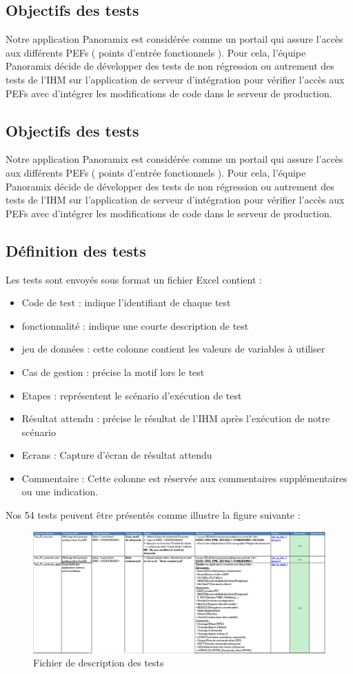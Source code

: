 \subsection{Objectifs des tests}
Notre application Panoramix est considérée comme un portail qui assure l’accès aux différents PEFs ( points d’entrée fonctionnels ). Pour cela, l’équipe Panoramix décide de développer des  tests de non régression ou autrement des tests de l’IHM sur l’application de serveur d'intégration pour vérifier l’accès aux PEFs avec d’intégrer les modifications de code dans le serveur de production.
\subsection{Objectifs des tests}
Notre application Panoramix est considérée comme un portail qui assure l’accès aux différents PEFs ( points d’entrée fonctionnels ). Pour cela, l’équipe Panoramix décide de développer des  tests de non régression ou autrement des tests de l’IHM sur l’application de serveur d'intégration pour vérifier l’accès aux PEFs avec d’intégrer les modifications de code dans le serveur de production.
\subsection{Définition des tests}
Les tests sont envoyés sous format un fichier Excel contient :
\begin{itemize}
	\item Code de test : indique l’identifiant de chaque test
	\item fonctionnalité : indique une courte description de test
	\item jeu de données : cette colonne contient les valeurs de variables à utiliser
	\item Cas de gestion : précise la motif lors le test
	\item Etapes : représentent le scénario d'exécution de test
	\item Résultat attendu : précise le résultat de l’IHM après l'exécution de notre scénario  
	\item Ecrans : Capture d’écran de résultat attendu 
	\item Commentaire : Cette colonne est réservée aux commentaires supplémentaires ou une indication.
\end{itemize}
Nos 54 tests peuvent être présentés comme illustre la figure suivante :
\begin{figure}[H]
	\centering
	\includegraphics[width=1\linewidth]{"img/excel robot"}
	\caption[Fichier de description des tests]{Fichier de description des tests}
	\label{fig:excel-robot}
\end{figure}
